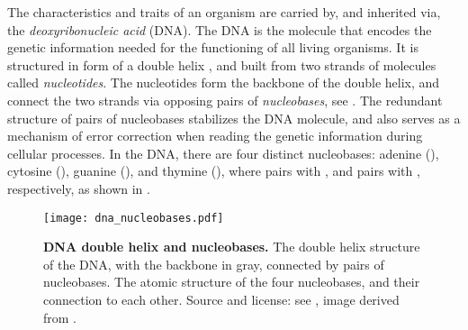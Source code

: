 
The characteristics and traits of an organism are carried by, and inherited via, the \emph{deoxyribonucleic acid} (DNA).
The DNA is the molecule that encodes the genetic information needed for the functioning of all living organisms.
It is structured in form of a double helix \cite{Watson1953},
and built from two strands of molecules called \emph{nucleotides}.
The nucleotides form the backbone of the double helix,
and connect the two strands via opposing pairs of \emph{nucleobases}, see .
The redundant structure of pairs of nucleobases stabilizes the DNA molecule,
and also serves as a mechanism of error correction when reading the genetic information during cellular processes.
In the DNA, there are four distinct nucleobases:
adenine (), cytosine (), guanine (), and thymine (),
where  pairs with , and  pairs with , respectively,
as shown in .

\begin{figure}[hpbt]
    \centering
    \texttt{[image: dna\_nucleobases.pdf]}
    \begin{subfigure}{0pt}
        \label{fig:dna_nucleobases:sub:dna_helix}
    \end{subfigure}
    \begin{subfigure}{0pt}
        \label{fig:dna_nucleobases:sub:nucleobases}
    \end{subfigure}
    \caption[DNA double helix and nucleobases]{
        \textbf{DNA double helix and nucleobases.}
        The double helix structure of the DNA, with the backbone in gray,
        connected by pairs of nucleobases.
        The atomic structure of the four nucleobases, and their connection to each other.
        Source and license: see \cite{Czech2018DNA},
        image derived from \cite{MesserWoland2006,Sponk2010,Yikrazuul2008a,Yikrazuul2008b}.
    }
    \label{fig:dna_nucleobases}
\end{figure}

